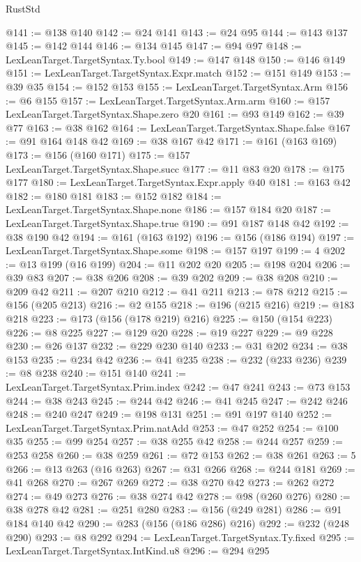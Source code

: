 \begin{lexlean}{RustStd}
\begin{coremodule}
@141 := @138 @140
@142 := @24 @141
@143 := @24 @95
@144 := @143 @137
@145 := @142 @144
@146 := @134 @145
@147 := @94 @97
@148 := LexLeanTarget.TargetSyntax.Ty.bool
@149 := @147 @148
@150 := @146 @149
@151 := LexLeanTarget.TargetSyntax.Expr.match
@152 := @151 @149
@153 := @39 @35
@154 := @152 @153
@155 := LexLeanTarget.TargetSyntax.Arm
@156 := @6 @155
@157 := LexLeanTarget.TargetSyntax.Arm.arm
@160 := @157 LexLeanTarget.TargetSyntax.Shape.zero @20
@161 := @93 @149
@162 := @39 @77
@163 := @38 @162
@164 := LexLeanTarget.TargetSyntax.Shape.false
@167 := @91 @164 @148 @42
@169 := @38 @167 @42
@171 := @161 (@163 @169)
@173 := @156 (@160 @171)
@175 := @157 LexLeanTarget.TargetSyntax.Shape.succ
@177 := @11 @83 @20
@178 := @175 @177
@180 := LexLeanTarget.TargetSyntax.Expr.apply @40
@181 := @163 @42
@182 := @180 @181
@183 := @152 @182
@184 := LexLeanTarget.TargetSyntax.Shape.none
@186 := @157 @184 @20
@187 := LexLeanTarget.TargetSyntax.Shape.true
@190 := @91 @187 @148 @42
@192 := @38 @190 @42
@194 := @161 (@163 @192)
@196 := @156 (@186 @194)
@197 := LexLeanTarget.TargetSyntax.Shape.some
@198 := @157 @197
@199 := 4
@202 := @13 @199 (@16 @199)
@204 := @11 @202 @20
@205 := @198 @204
@206 := @39 @83
@207 := @38 @206
@208 := @39 @202
@209 := @38 @208
@210 := @209 @42
@211 := @207 @210
@212 := @41 @211
@213 := @78 @212
@215 := @156 (@205 @213)
@216 := @2 @155
@218 := @196 (@215 @216)
@219 := @183 @218
@223 := @173 (@156 (@178 @219) @216)
@225 := @150 (@154 @223)
@226 := @8 @225
@227 := @129 @20
@228 := @19 @227
@229 := @9 @228
@230 := @26 @137
@232 := @229 @230 @140
@233 := @31 @202
@234 := @38 @153
@235 := @234 @42
@236 := @41 @235
@238 := @232 (@233 @236)
@239 := @8 @238
@240 := @151 @140
@241 := LexLeanTarget.TargetSyntax.Prim.index
@242 := @47 @241
@243 := @73 @153
@244 := @38 @243
@245 := @244 @42
@246 := @41 @245
@247 := @242 @246
@248 := @240 @247
@249 := @198 @131
@251 := @91 @197 @140
@252 := LexLeanTarget.TargetSyntax.Prim.natAdd
@253 := @47 @252
@254 := @100 @35
@255 := @99 @254
@257 := @38 @255 @42
@258 := @244 @257
@259 := @253 @258
@260 := @38 @259
@261 := @72 @153
@262 := @38 @261
@263 := 5
@266 := @13 @263 (@16 @263)
@267 := @31 @266
@268 := @244 @181
@269 := @41 @268
@270 := @267 @269
@272 := @38 @270 @42
@273 := @262 @272
@274 := @49 @273
@276 := @38 @274 @42
@278 := @98 (@260 @276)
@280 := @38 @278 @42
@281 := @251 @280
@283 := @156 (@249 @281)
@286 := @91 @184 @140 @42
@290 := @283 (@156 (@186 @286) @216)
@292 := @232 (@248 @290)
@293 := @8 @292
@294 := LexLeanTarget.TargetSyntax.Ty.fixed
@295 := LexLeanTarget.TargetSyntax.IntKind.u8
@296 := @294 @295

\end{coremodule}
\end{lexlean}
